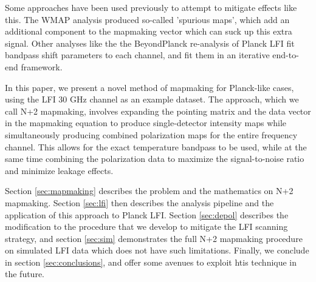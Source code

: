 \documentclass{aa}
\begin{document}
Some approaches have been used previously to attempt to mitigate effects like this. The WMAP analysis produced so-called 'spurious maps', which add an additional component to the mapmaking vector which can suck up this extra signal. \citep{spurious} Other analyses like the the BeyondPlanck re-analysis of Planck LFI fit bandpass shift parameters to each channel, and fit them in an iterative end-to-end framework. \citep{BP09}

In this paper, we present a novel method of mapmaking for Planck-like cases, using the LFI 30 GHz channel as an example dataset. The approach, which we call N+2 mapmaking, involves expanding the pointing matrix and the data vector in the mapmaking equation to produce single-detector intensity maps while simultaneously producing combined polarization maps for the entire frequency channel. This allows for the exact temperature bandpass to be used, while at the same time combining the polarization data to maximize the signal-to-noise ratio and minimize leakage effects.

Section \ref{sec:mapmaking} describes the problem and the mathematics on N+2 mapmaking. Section \ref{sec:lfi} then describes the analysis pipeline and the application of this approach to Planck LFI. Section \ref{sec:depol} describes the modification to the procedure that we develop to mitigate the LFI scanning strategy, and section \ref{sec:sim} demonstrates the full N+2 mapmaking procedure on simulated LFI data which does not have such limitations. Finally, we conclude in section \ref{sec:conclusions}, and offer some avenues to exploit htis technique in the future.
\end{document}
